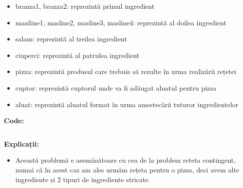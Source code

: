  \begin{itemize}
    \setlength\itemsep{0em}
    \item branza1, branza2: reprezintă primul ingredient
    \item masiline1, masline2, masline3, masline4: reprezintă al doilea ingredient
    \item salam: reprezintă al treilea ingredient
    \item ciuperci: reprezintă al patrulea ingredient
    \item pizza: reprezintă produsul care trebuie să rezulte în urma realizării rețetei
    \item cuptor: reprezintă cuptorul unde va fi adăugat aluatul pentru pizza
    \item aluat: reprezintă aluatul format în urma amestecării tuturor ingredientelor


\end{itemize}
\textbf{Code:}

    \inputminted[linenos]{C}{cod/problem2_reteta_contingent.pddl}
    
 \textbf{ Explicații:}

  \begin{itemize}
    \setlength\itemsep{0em}
    \item Această problemă e asemănătoare cu cea de la problem reteta contingent, numai că în acest caz am ales urmăm rețeta pentru o
  pizza, deci avem alte ingrediente și 2 tipuri de ingrediente stricate.

  
\end{itemize}   
    
    